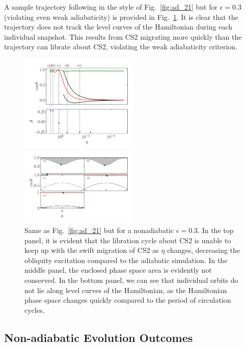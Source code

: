 \documentclass[
        fleqn,
        usenatbib,
    ]{mnras}
\begin{document}
A sample trajectory following in the style of Fig.~\ref{fig:ad_21} but for
$\epsilon = 0.3$ (violating even weak adiabaticity) is provided in
Fig.~\ref{fig:nonad_traj}. It is clear that the trajectory does not track the
level curves of the Hamiltonian during each individual snapshot. This results
from CS2 migrating more quickly than the trajectory can librate about CS2,
violating the weak adiabaticity criterion.
\begin{figure}
    \centering
    \includegraphics[width=0.5\textwidth]{plots_diskdisp/3testo_nonad.png}

    \includegraphics[width=0.5\textwidth]{plots_diskdisp/3testo_nonad_subplots.png}
    \caption{Same as Fig.~\ref{fig:ad_21} but for a nonadiabatic $\epsilon =
    0.3$. In the top panel, it is evident that the libration cycle about CS2 is
    unable to keep up with the swift migration of CS2 as $\eta$ changes,
    decreasing the obliquity excitation compared to the adiabatic simulation. In
    the middle panel, the enclosed phase space area is evidently not conserved.
    In the bottom panel, we can see that individual orbits do not lie along
    level curves of the Hamiltonian, as the Hamiltonian phase space changes
    quickly compared to the period of circulation cycles.}\label{fig:nonad_traj}
\end{figure}

\subsection{Non-adiabatic Evolution Outcomes}
\end{document}
